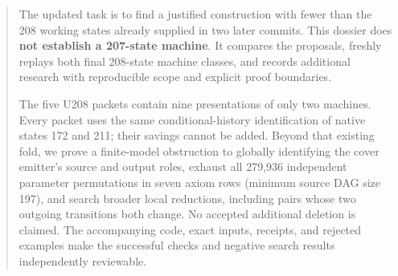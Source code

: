 \begin{abstract}
The updated task is to find a justified construction with fewer than the
208 working states already supplied in two later commits. This dossier
does \textbf{not establish a 207-state machine}. It compares the proposals,
freshly replays both final 208-state machine classes, and records additional
research with reproducible scope and explicit proof boundaries.

The five U208 packets contain nine presentations of only two machines.
Every packet uses the same conditional-history identification of native
states 172 and 211; their savings cannot be added. Beyond that existing
fold, we prove a finite-model obstruction to globally identifying the cover
emitter's source and output roles, exhaust all 279,936 independent parameter
permutations in seven axiom rows (minimum source DAG size 197), and search
broader local reductions, including pairs whose two outgoing transitions
both change. No accepted additional deletion is claimed. The accompanying
code, exact inputs, receipts, and rejected examples make the successful
checks and negative search results independently reviewable.
\end{abstract}
